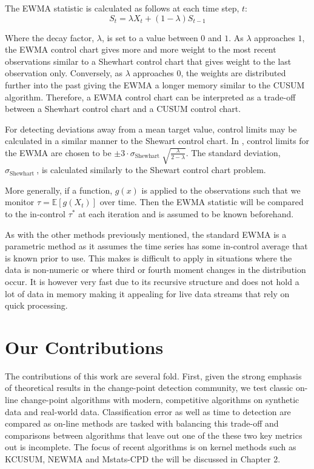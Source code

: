 The EWMA statistic is calculated as follows at each time step, $t$:
$$S_t = \lambda X_t + (1-\lambda)S_{t-1} $$

Where the decay factor,  $\lambda$, is set to a value between $0$ and $1$. As $\lambda$ approaches $1$, the EWMA control chart gives more and more weight to the most recent observations similar to a Shewhart control chart that gives weight to the last observation only. Conversely, as $\lambda$ approaches $0$, the weights are distributed further into the past giving the EWMA a longer memory similar to the CUSUM algorithm. Therefore, a EWMA control chart can be interpreted as a trade-off between a Shewhart control chart and a CUSUM control chart. 

For detecting deviations away from a mean target value, control limits may be calculated in a similar manner to the Shewart control chart. In \cite{hunter1986exponentially}, control limits for the EWMA are chosen to be  $\pm 3 \cdot \sigma_{\text {Shewhart }} \sqrt{\frac{\lambda}{2-\lambda}}$. The standard deviation, $\sigma_{\text {Shewhart }}$, is calculated similarly to the Shewart control chart problem. %

More generally, if a function, $g(x)$ is applied to the observations such that we monitor $\tau= \mathbb{E}[g(X_t)]$ over time. Then the EWMA statistic will be compared to the in-control $\tau^*$ at each iteration and is assumed to be known beforehand.  

As with the other methods previously mentioned, the standard EWMA is a parametric method as it assumes the time series has some in-control average that is known prior to use. This makes is difficult to apply in situations where the data is non-numeric or where third or fourth moment changes in the distribution occur. It is however very fast due to its recursive structure and does not hold a lot of data in memory making it appealing for live data streams that rely on quick processing.


\section{Our Contributions}
The contributions of this work are several fold. First, given the strong emphasis of theoretical results in the change-point detection community, we test classic on-line change-point algorithms with modern, competitive algorithms on synthetic data and real-world data. Classification error as well as time to detection are compared as on-line methods are tasked with balancing this trade-off and comparisons between algorithms that leave out one of the these two key metrics out is incomplete. The focus of recent algorithms is on kernel methods such as KCUSUM, NEWMA and Mstats-CPD the will be discussed in Chapter 2.